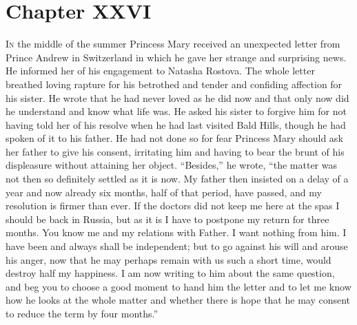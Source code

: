 
\chapter*{Chapter XXVI}
\ifaudio     
{} 
\fi

\lettrine[lines=2, loversize=0.3, lraise=0]{\initfamily I}{n}
the middle of the summer Princess Mary received an unexpected
letter from Prince Andrew in Switzerland in which he gave her
strange and surprising news. He informed her of his engagement to
Natasha Rostova.  The whole letter breathed loving rapture for
his betrothed and tender and confiding affection for his
sister. He wrote that he had never loved as he did now and that
only now did he understand and know what life was. He asked his
sister to forgive him for not having told her of his resolve when
he had last visited Bald Hills, though he had spoken of it to his
father. He had not done so for fear Princess Mary should ask her
father to give his consent, irritating him and having to bear the
brunt of his displeasure without attaining her
object. ``Besides,'' he wrote, ``the matter was not then so
definitely settled as it is now. My father then insisted on a
delay of a year and now already six months, half of that period,
have passed, and my resolution is firmer than ever. If the
doctors did not keep me here at the spas I should be back in
Russia, but as it is I have to postpone my return for three
months. You know me and my relations with Father. I want nothing
from him. I have been and always shall be independent; but to go
against his will and arouse his anger, now that he may perhaps
remain with us such a short time, would destroy half my
happiness. I am now writing to him about the same question, and
beg you to choose a good moment to hand him the letter and to let
me know how he looks at the whole matter and whether there is
hope that he may consent to reduce the term by four months.''

